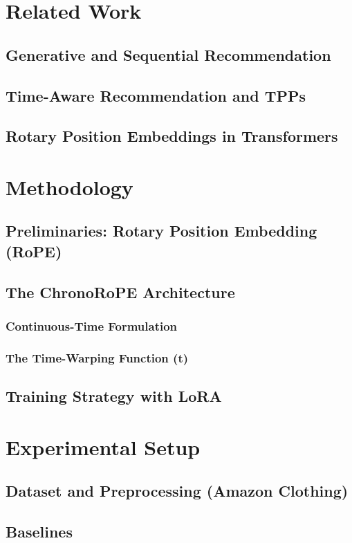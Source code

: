 \documentclass[sigconf]{acmart}
\begin{document}
\section{Related Work}
\subsection{Generative and Sequential Recommendation}
\subsection{Time-Aware Recommendation and TPPs}
\subsection{Rotary Position Embeddings in Transformers}

\section{Methodology}
\subsection{Preliminaries: Rotary Position Embedding (RoPE)}
\subsection{The ChronoRoPE Architecture}
\subsubsection{Continuous-Time Formulation}
\subsubsection{The Time-Warping Function \tau(t)}
\subsection{Training Strategy with LoRA}

\section{Experimental Setup}
\subsection{Dataset and Preprocessing (Amazon Clothing)}
\subsection{Baselines}
\end{document}
